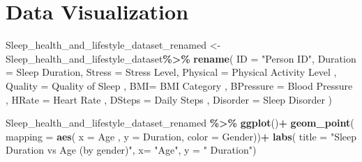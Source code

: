 \documentclass[
  11pt,
]{article}
\newenvironment{Shaded}{\begin{snugshade}}{\end{snugshade}}
\newcommand{\AttributeTok}[1]{\textcolor[rgb]{0.13,0.29,0.53}{#1}}
\newcommand{\FunctionTok}[1]{\textcolor[rgb]{0.13,0.29,0.53}{\textbf{#1}}}
\newcommand{\NormalTok}[1]{#1}
\newcommand{\OtherTok}[1]{\textcolor[rgb]{0.56,0.35,0.01}{#1}}
\newcommand{\SpecialCharTok}[1]{\textcolor[rgb]{0.81,0.36,0.00}{\textbf{#1}}}
\newcommand{\StringTok}[1]{\textcolor[rgb]{0.31,0.60,0.02}{#1}}
\begin{document}
\hypertarget{data-visualization}{%
\section{Data Visualization}\label{data-visualization}}

\begin{Shaded}
\begin{Highlighting}[]
\NormalTok{Sleep\_health\_and\_lifestyle\_dataset\_renamed }\OtherTok{\textless{}{-}}\NormalTok{ Sleep\_health\_and\_lifestyle\_dataset}\SpecialCharTok{\%\textgreater{}\%}
  \FunctionTok{rename}\NormalTok{( }\AttributeTok{ID =} \StringTok{"Person ID"}\NormalTok{,}
          \AttributeTok{Duration =} \StringTok{\textquotesingle{}Sleep Duration\textquotesingle{}}\NormalTok{,}
          \AttributeTok{Stress =} \StringTok{\textquotesingle{}Stress Level\textquotesingle{}}\NormalTok{,}
          \AttributeTok{Physical =} \StringTok{\textquotesingle{}Physical Activity Level\textquotesingle{}}\NormalTok{ ,}
          \AttributeTok{Quality =} \StringTok{\textquotesingle{}Quality of Sleep\textquotesingle{}}\NormalTok{ ,}
          \AttributeTok{BMI=} \StringTok{\textquotesingle{}BMI Category\textquotesingle{}}\NormalTok{ ,}
          \AttributeTok{BPressure =} \StringTok{\textquotesingle{}Blood Pressure\textquotesingle{}}\NormalTok{ ,}
          \AttributeTok{HRate =} \StringTok{\textquotesingle{}Heart Rate\textquotesingle{}}\NormalTok{ ,}
          \AttributeTok{DSteps =} \StringTok{\textquotesingle{}Daily Steps\textquotesingle{}}\NormalTok{ ,}
          \AttributeTok{Disorder =} \StringTok{\textquotesingle{}Sleep Disorder\textquotesingle{}}\NormalTok{ )}
\end{Highlighting}
\end{Shaded}

\begin{Shaded}
\begin{Highlighting}[]
\NormalTok{Sleep\_health\_and\_lifestyle\_dataset\_renamed }\SpecialCharTok{\%\textgreater{}\%}
  \FunctionTok{ggplot}\NormalTok{()}\SpecialCharTok{+}
  \FunctionTok{geom\_point}\NormalTok{( }\AttributeTok{mapping =} \FunctionTok{aes}\NormalTok{( }\AttributeTok{x =}\NormalTok{ Age , }\AttributeTok{y =}\NormalTok{ Duration, }\AttributeTok{color =}\NormalTok{ Gender))}\SpecialCharTok{+}
  \FunctionTok{labs}\NormalTok{(}
   \AttributeTok{title =} \StringTok{"Sleep Duration vs Age (by gender)"}\NormalTok{,}
   \AttributeTok{x=} \StringTok{"Age"}\NormalTok{, }\AttributeTok{y =} \StringTok{" Duration"}\NormalTok{)}
\end{Highlighting}
\end{Shaded}
\end{document}
